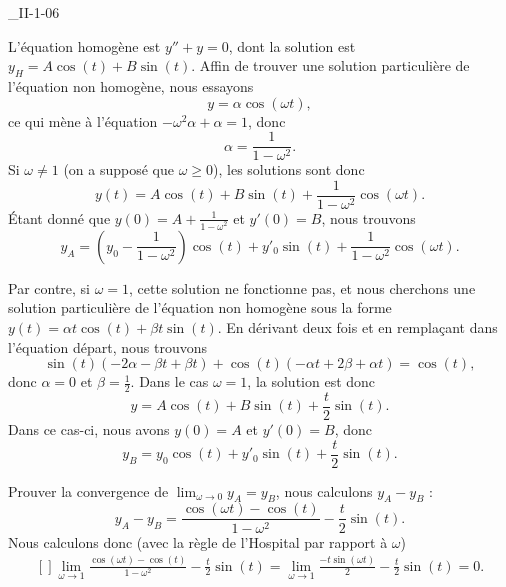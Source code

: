 

\begin{corrige}{_II-1-06}

L'équation homogène est $y''+y=0$, dont la solution est $y_H=A\cos(t)+B\sin(t)$. Affin de trouver une solution particulière de l'équation non homogène, nous essayons
\begin{equation}
	y=\alpha\cos(\omega t),
\end{equation}
ce qui mène à l'équation $-\omega^2\alpha+\alpha=1$, donc
\begin{equation}
	\alpha=\frac{1}{ 1-\omega^2 }.
\end{equation}
Si $\omega\neq 1$ (on a supposé que $\omega\geq0$), les solutions sont donc
\begin{equation}
	y(t)=A\cos(t)+B\sin(t)+\frac{1}{ 1-\omega^2 }\cos(\omega t).
\end{equation}
Étant donné que $y(0)=A+\frac{1}{ 1-\omega^2 }$ et $y'(0)=B$, nous trouvons
\begin{equation}
	y_A=\left( y_0-\frac{1}{ 1-\omega^2 } \right)\cos(t)+y'_0\sin(t)+\frac{1}{ 1-\omega^2 }\cos(\omega t).
\end{equation}

Par contre, si $\omega=1$, cette solution ne fonctionne pas, et nous cherchons une solution particulière de l'équation non homogène sous la forme $y(t)=\alpha t\cos(t)+\beta t\sin(t)$. En dérivant deux fois et en remplaçant dans l'équation départ, nous trouvons
\begin{equation}
	\sin(t)(-2\alpha-\beta t+\beta t)+\cos(t)(-\alpha t+2\beta+\alpha t)=\cos(t),
\end{equation}
donc $\alpha=0$ et $\beta=\frac{ 1 }{2}$. Dans le cas $\omega=1$, la solution est donc
\begin{equation}
	y=A\cos(t)+B\sin(t)+\frac{ t }{ 2 }\sin(t).
\end{equation}
Dans ce cas-ci, nous avons $y(0)=A$ et $y'(0)=B$, donc
\begin{equation}
	y_B=y_0\cos(t)+y'_0\sin(t)+\frac{ t }{2}\sin(t).
\end{equation}

Prouver la convergence de $\lim_{\omega\to 0}y_A=y_B$, nous calculons $y_A-y_B$ :
\begin{equation}
	y_A-y_B=\frac{ \cos(\omega t)-\cos(t) }{ 1-\omega^2 }-\frac{ t }{2}\sin(t).
\end{equation}
Nous calculons donc (avec la règle de l'Hospital par rapport à $\omega$)
\begin{equation}
	\begin{aligned}[]
		\lim_{\omega\to 1}\frac{ \cos(\omega t)-\cos(t) }{ 1-\omega^2 }-\frac{ t }{2}\sin(t)=\lim_{\omega\to 1}\frac{ -t\sin(\omega t) }{2}-\frac{ t }{2}\sin(t)=0.
	\end{aligned}
\end{equation}

\end{corrige}

